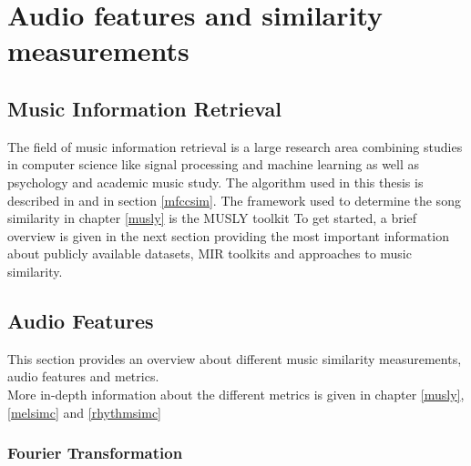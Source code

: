 \chapter{Audio features and similarity measurements}\label{audiofeat}

\section{Music Information Retrieval}
The field of music information retrieval is a large research area combining studies in computer science like signal processing and machine learning as well as psychology and academic music study.
The algorithm used in this thesis is described in \cite[pp. 17ff]{schnitzer1} and in section \ref{mfccsim}.
The framework used to determine the song similarity in chapter \ref{musly} is the MUSLY toolkit \cite{musly1}
To get started, a brief overview is given in the next section providing the most important information about publicly available datasets, MIR toolkits and approaches to music similarity.

\section{Audio Features}

This section provides an overview about different music similarity measurements, audio features and metrics.\\
More in-depth information about the different metrics is given in chapter \ref{musly}, \ref{melsimc} and \ref{rhythmsimc}

\subsection{Fourier Transformation}\label{featsec}

